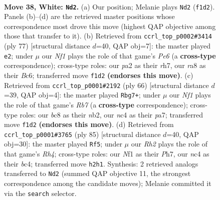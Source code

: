 \documentclass[11pt]{article}
\begin{document}
\clearpage

\begin{figure}[p]\centering
\begin{subfigure}{0.46\textwidth}\centering
\resizebox{\linewidth}{!}{%
\newchessgame
\chessboard[
  setfen={r1b2k2/8/8/1r6/2n1R2p/7P/p5PR/K4N2 w - - 2 38},
  showmover=false,
  pgfstyle=straightmove, color=movearrow, markmove={f1-d2}
]}
\caption{}
\end{subfigure}\hfill
\begin{subfigure}{0.46\textwidth}\centering
\resizebox{\linewidth}{!}{%
\newchessgame
\chessboard[
  setfen={5k2/7R/2b2Pp1/8/1p3K2/3Bp2P/1P4r1/8 b - - 1 39},
  showmover=false,
  pgfstyle=straightmove, color=movearrow, markmove={e3-e2}
]}
\caption{}
\end{subfigure}
\\[4pt]
\begin{subfigure}{0.46\textwidth}\centering
\resizebox{\linewidth}{!}{%
\newchessgame
\chessboard[
  setfen={6k1/pR5R/6p1/6P1/7P/2r5/Pn3r2/1K6 w - - 6 34},
  showmover=false,
  pgfstyle=straightmove, color=movearrow, markmove={b7-g7}
]}
\caption{}
\end{subfigure}\hfill
\begin{subfigure}{0.46\textwidth}\centering
\resizebox{\linewidth}{!}{%
\newchessgame
\chessboard[
  setfen={7k/1p5p/p7/P1p4r/2B1rP2/5NK1/8/2R5 b - - 5 43},
  showmover=false,
  pgfstyle=straightmove, color=movearrow, markmove={h5-f5}
]}
\caption{}
\end{subfigure}
\caption{\textbf{Move 38, White: \texttt{Nd2}.} (a) Our position; Melanie plays \texttt{Nd2} (\texttt{f1d2}). Panels (b)--(d) are the retrieved master positions whose correspondence most drove this move (highest QAP objective among those that transfer to it). (b) Retrieved from \texttt{ccrl\_top\_p0002\#3414} (ply 77) [structural distance $d$=40, QAP obj=7]: the master played \texttt{e2}; under $\mu$ our \emph{Nf1} plays the role of that game's \emph{Pe6} (a \textbf{cross-type} correspondence); cross-type roles: our \emph{p}a2 as their \emph{r}h7, our \emph{r}a8 as their \emph{B}c6; transferred move \texttt{f1d2} \textbf{(endorses this move)}. (c) Retrieved from \texttt{ccrl\_top\_p0001\#2192} (ply 66) [structural distance $d$=39, QAP obj=4]: the master played \texttt{Rbg7+}; under $\mu$ our \emph{Nf1} plays the role of that game's \emph{Rb7} (a \textbf{cross-type} correspondence); cross-type roles: our \emph{b}c8 as their \emph{n}b2, our \emph{n}c4 as their \emph{p}a7; transferred move \texttt{f1d2} \textbf{(endorses this move)}. (d) Retrieved from \texttt{ccrl\_top\_p0001\#3765} (ply 85) [structural distance $d$=40, QAP obj=30]: the master played \texttt{Rf5}; under $\mu$ our \emph{Rh2} plays the role of that game's \emph{Rh4}; cross-type roles: our \emph{N}f1 as their \emph{P}h7, our \emph{n}c4 as their \emph{b}c4; transferred move \texttt{h2h1}. Synthesis: 2 retrieved analogs transferred to \texttt{Nd2} (summed QAP objective 11, the strongest correspondence among the candidate moves); Melanie committed it via the \texttt{search} selector.}
\label{fig:thought-m74}
\end{figure}
\end{document}
